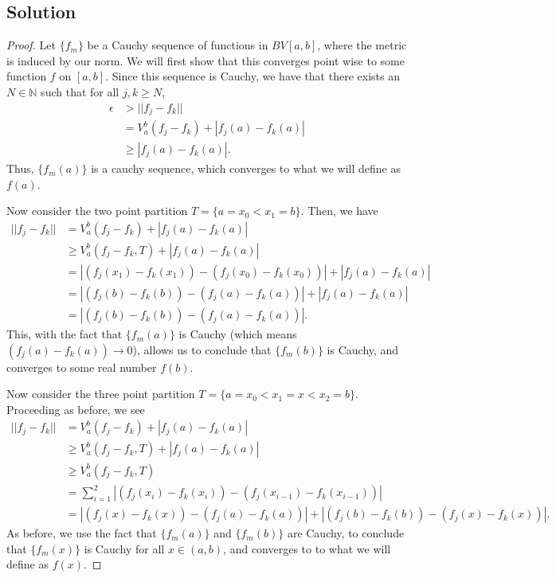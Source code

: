 \documentclass[10pt,a4paper]{article}
\theoremstyle{theorem}
\theoremstyle{definition}
\begin{document}
\subsection*{Solution}
\begin{proof}
Let $\{f_m\}$ be a Cauchy sequence of functions in $BV[a, b]$, where the metric is induced by our norm. We will first show that this converges point wise to some function $f$ on $[a, b]$. Since this sequence is Cauchy, we have that there exists an $N \in \mathbb{N}$ such that for all $j, k \geq N$, 
\begin{align*}
\epsilon &> ||f_j - f_k||\\
&= V_{a}^{b}(f_j - f_k) + |f_j(a) - f_k(a)|\\
&\geq |f_j(a) - f_k(a)|.
\end{align*}
Thus, $\{f_m(a) \}$ is a cauchy sequence, which converges to what we will define as $f(a)$.

Now consider the two point partition $T = \{a=x_0 < x_1 = b \}$. Then, we have
\begin{align*}
||f_j - f_k|| &= V_{a}^{b}(f_j - f_k) + |f_j(a) - f_k(a)|\\
&\geq V_{a}^{b}(f_j - f_k, T) + |f_j(a) - f_k(a)|\\
&= |(f_j(x_1) - f_k(x_1)) - (f_j(x_0) - f_k(x_0))| + |f_j(a) - f_k(a)|\\
&= |(f_j(b) - f_k(b)) - (f_j(a) - f_k(a))| + |f_j(a) - f_k(a)|\\
&= |(f_j(b) - f_k(b)) - (f_j(a) - f_k(a))|.
\end{align*}
This, with the fact that $\{f_m(a)\}$ is Cauchy (which means $(f_j(a) - f_k(a)) \to 0$), allows us to conclude that $\{f_m(b)\}$ is Cauchy, and converges to some real number $f(b)$.

Now consider the three point partition $T = \{a=x_0 < x_1 = x < x_2 = b \}$. Proceeding as before, we see
\begin{align*}
||f_j - f_k|| &= V_{a}^{b}(f_j - f_k) + |f_j(a) - f_k(a)|\\
&\geq V_{a}^{b}(f_j - f_k, T) + |f_j(a) - f_k(a)|\\
&\geq V_{a}^{b}(f_j - f_k, T)\\
&= \sum_{i=1}^2 |(f_j(x_i) - f_k(x_i)) - (f_j(x_{i-1}) - f_k(x_{i-1}))|\\
&= |(f_j(x) - f_k(x)) - (f_j(a) - f_k(a))| + |(f_j(b) - f_k(b)) - (f_j(x) - f_k(x))|.
\end{align*}
As before, we use the fact that $\{f_m(a)\}$ and $\{f_m(b)\}$ are Cauchy, to conclude that $\{f_m(x)\}$ is Cauchy for all $x \in (a, b)$, and converges to to what we will define as $f(x)$.


\end{proof}
\end{document}
